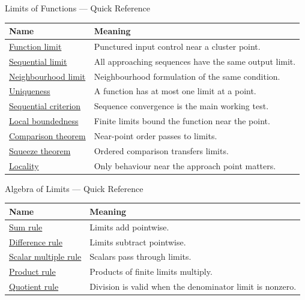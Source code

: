 \begin{toolkitbox}{Limits of Functions --- Quick Reference}
\small
\begin{tabular}{l l}
\toprule
\textbf{Name} & \textbf{Meaning}\\
\midrule
\hyperref[def:limit-function]{Function limit} & Punctured input control near a cluster point.\\
\hyperref[def:limit-function-sequential]{Sequential limit} & All approaching sequences have the same output limit.\\
\hyperref[def:limit-function-neighbourhood]{Neighbourhood limit} & Neighbourhood formulation of the same condition.\\
\hyperref[thm:limit-unique]{Uniqueness} & A function has at most one limit at a point.\\
\hyperref[prop:sequential-criterion-limits]{Sequential criterion} & Sequence convergence is the main working test.\\
\hyperref[thm:limit-implies-local-bounding]{Local boundedness} & Finite limits bound the function near the point.\\
\hyperref[thm:comparison-function-limits]{Comparison theorem} & Near-point order passes to limits.\\
\hyperref[thm:squeeze-function-limits]{Squeeze theorem} & Ordered comparison transfers limits.\\
\hyperref[thm:limits-are-local]{Locality} & Only behaviour near the approach point matters.\\
\bottomrule
\end{tabular}
\end{toolkitbox}


\begin{toolkitbox}{Algebra of Limits --- Quick Reference}
\small
\begin{tabular}{l l}
\toprule
\textbf{Name} & \textbf{Meaning}\\
\midrule
\hyperref[thm:limit-sum]{Sum rule} & Limits add pointwise.\\
\hyperref[thm:limit-difference]{Difference rule} & Limits subtract pointwise.\\
\hyperref[thm:limit-scalar-multiple]{Scalar multiple rule} & Scalars pass through limits.\\
\hyperref[thm:limit-product]{Product rule} & Products of finite limits multiply.\\
\hyperref[thm:limit-quotient]{Quotient rule} & Division is valid when the denominator limit is nonzero.\\
\bottomrule
\end{tabular}
\end{toolkitbox}





